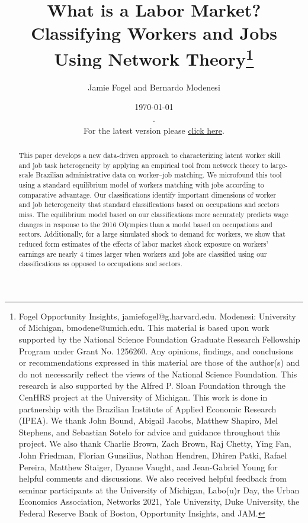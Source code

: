 \documentclass[12pt]{article}
\title{What is a Labor Market? \\ Classifying Workers and Jobs Using Network Theory\footnote{Fogel Opportunity Insights, jamiefogel@g.harvard.edu.  Modenesi: University of Michigan, bmodene@umich.edu. This material is based upon work supported by the National Science Foundation Graduate Research Fellowship Program under Grant No. 1256260. Any opinions, findings, and conclusions or recommendations expressed in this material are those of the author(s) and do not necessarily reflect the views of the National Science Foundation. This research is also supported by the Alfred P. Sloan Foundation through the CenHRS project at the University of Michigan. This work is done in partnership with the Brazilian Institute of Applied Economic Research (IPEA). We thank John Bound, Abigail Jacobs, Matthew Shapiro, Mel Stephens, and Sebastian Sotelo for advice and guidance throughout this project. We also thank Charlie Brown, Zach Brown, Raj Chetty, Ying Fan, John Friedman, Florian Gunsilius, Nathan Hendren, Dhiren Patki, Rafael Pereira, Matthew Staiger, Dyanne Vaught, and Jean-Gabriel Young for helpful comments and discussions.  We also received helpful feedback from seminar participants at the University of Michigan, Labo(u)r Day, the Urban Economics Association, Networks 2021, Yale University, Duke University, the Federal Reserve Bank of Boston, Opportunity Insights, and JAM.}}
\author{Jamie Fogel and Bernardo Modenesi}
\date{ \today \\ {\color{white} . } \\For the latest version please \href{https://drive.google.com/file/d/1_5CrJHTDSiAjA0ViSIFIZWjwGfQIoZKK/view?usp=sharing}{click here}. }
\theoremstyle{definition}
\theoremstyle{plain}
\begin{document}
\maketitle



\begin{abstract}
This paper develops a new data-driven approach to characterizing latent worker skill and job task heterogeneity by applying an empirical tool from network theory to large-scale Brazilian administrative data on worker--job matching. We microfound this tool using a standard equilibrium model of workers matching with jobs according to comparative advantage. Our classifications identify important dimensions of worker and job heterogeneity that standard classifications based on occupations and sectors miss. The equilibrium model based on our classifications more accurately predicts wage changes in response to the 2016 Olympics than a model based on occupations and sectors. Additionally, for a large simulated shock to demand for workers, we show that reduced form estimates of the effects of labor market shock exposure on workers' earnings are nearly 4 times larger when workers and jobs are classified using our classifications as opposed to occupations and sectors. 
\end{abstract}
\clearpage

\end{document}
